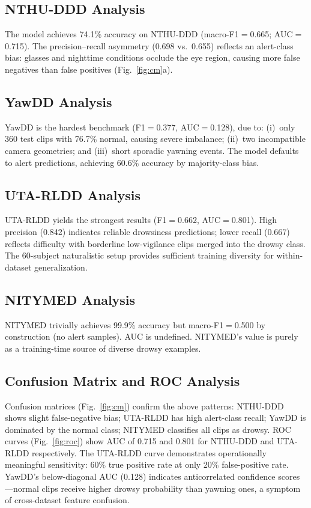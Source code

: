 \documentclass[journal]{IEEEtran}
\begin{document}
\subsection{NTHU-DDD Analysis}
\label{sec:eval_nthu}
The model achieves 74.1\% accuracy on NTHU-DDD (macro-F1$=$0.665; AUC$=$0.715). The precision--recall asymmetry (0.698 vs.\ 0.655) reflects an alert-class bias: glasses and nighttime conditions occlude the eye region, causing more false negatives than false positives (Fig.~\ref{fig:cm}a).

\subsection{YawDD Analysis}
\label{sec:eval_yawdd}
YawDD is the hardest benchmark (F1$=$0.377, AUC$=$0.128), due to: (i)~only 360 test clips with 76.7\% normal, causing severe imbalance; (ii)~two incompatible camera geometries; and (iii)~short sporadic yawning events. The model defaults to alert predictions, achieving 60.6\% accuracy by majority-class bias.

\subsection{UTA-RLDD Analysis}
\label{sec:eval_uta}
UTA-RLDD yields the strongest results (F1$=$0.662, AUC$=$0.801). High precision (0.842) indicates reliable drowsiness predictions; lower recall (0.667) reflects difficulty with borderline low-vigilance clips merged into the drowsy class. The 60-subject naturalistic setup provides sufficient training diversity for within-dataset generalization.

\subsection{NITYMED Analysis}
\label{sec:eval_nitymed}
NITYMED trivially achieves 99.9\% accuracy but macro-F1$=$0.500 by construction (no alert samples). AUC is undefined. NITYMED's value is purely as a training-time source of diverse drowsy examples.

\subsection{Confusion Matrix and ROC Analysis}
\label{sec:eval_cm}
Confusion matrices (Fig.~\ref{fig:cm}) confirm the above patterns: NTHU-DDD shows slight false-negative bias; UTA-RLDD has high alert-class recall; YawDD is dominated by the normal class; NITYMED classifies all clips as drowsy. ROC curves (Fig.~\ref{fig:roc}) show AUC of 0.715 and 0.801 for NTHU-DDD and UTA-RLDD respectively. The UTA-RLDD curve demonstrates operationally meaningful sensitivity: 60\% true positive rate at only 20\% false-positive rate. YawDD's below-diagonal AUC (0.128) indicates anticorrelated confidence scores---normal clips receive higher drowsy probability than yawning ones, a symptom of cross-dataset feature confusion.
\end{document}
